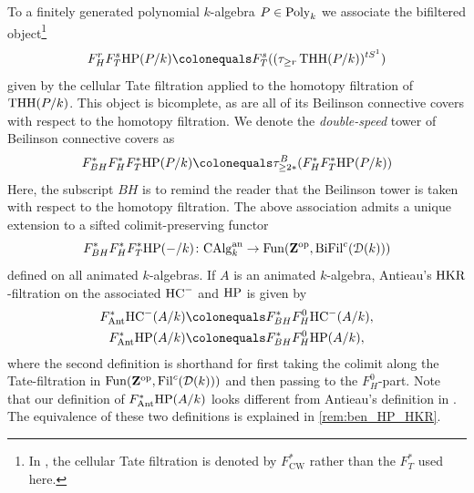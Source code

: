 \documentclass[oneside,a4paper]{amsart}
\begin{document}
\begin{recollection}
\label{recollection:antieaus_hkr}
To a finitely generated polynomial $k$-algebra $P \in \mathrm{Poly}_{k}$ we associate the bifiltered object\footnote{In \cite{antieau2019periodic}, the cellular Tate filtration is denoted by $F^{\ast}_{\mathrm{CW}}$ rather than the $F^{\ast}_{T}$ used here.}
\[
F^{r}_{H} F^{s}_{T} \HP(P/k) \colonequals F^{s}_{T}((\tau_{\geq r} \THH(P/k))^{tS^{1}}) 
\]
given by the cellular Tate filtration applied to the homotopy filtration of $\operatorname{THH}(P/k)$. This object is bicomplete, as are all of its Beilinson connective covers with respect to the homotopy filtration. We denote the \emph{double-speed} tower of Beilinson connective covers as 
\[
F^{\ast}_{BH} F^{\ast}_{H} F^{\ast}_{T} \HP(P/k) \colonequals \tau_{\geq 2\ast}^{B} (F^{\ast}_{H} F^{\ast}_{T} \HP(P/k))
\] 
Here, the subscript $BH$ is to remind the reader that the Beilinson tower is taken with respect to the homotopy filtration. The above association admits a unique extension to a sifted colimit-preserving functor
\[
F^{\ast}_{BH} F^{\ast}_{H} F^{\ast}_{T} \mathrm{HP}(-/k) \colon \mathrm{CAlg}_{k}^{\mathrm{an}} \rightarrow \mathrm{Fun}(\mathbf{Z}^{\mathrm{op}}, \mathrm{BiFil}^{c}(\EuScript{D}(k)))
\] 
defined on all animated $k$-algebras. If $A$ is an animated $k$-algebra, Antieau's $\mathrm{HKR}$-filtration on the associated $\mathrm{HC}^{-}$ and $\mathrm{HP}$ is given by 
\begin{align*}
F^{\ast}_{\AntHKR} \HC^{-}(A/k) &\colonequals F^{\ast}_{BH} F^{0}_{H} \HC^-(A/k), \\
F^{\ast}_{\AntHKR} \HP(A/k) &\colonequals F^{\ast}_{BH} F^{0}_{H} \HP(A/k),
\end{align*}
where the second definition is shorthand for first taking the colimit along the Tate-filtration in $\mathrm{Fun}(\mathbf{Z}^{\mathrm{op}}, \operatorname{Fil}^c(\mathcal{D}(k)))$ and then passing to the $F^0_H$-part. Note that our definition of $F^{\ast}_{\mathrm{Ant}} \mathrm{HP}(A/k)$ looks different from Antieau's definition in \cite[Proof of Corollary~4.12]{antieau2019periodic}. The equivalence of these two definitions is explained in \cref{rem:ben_HP_HKR}.
\end{recollection}
\end{document}
